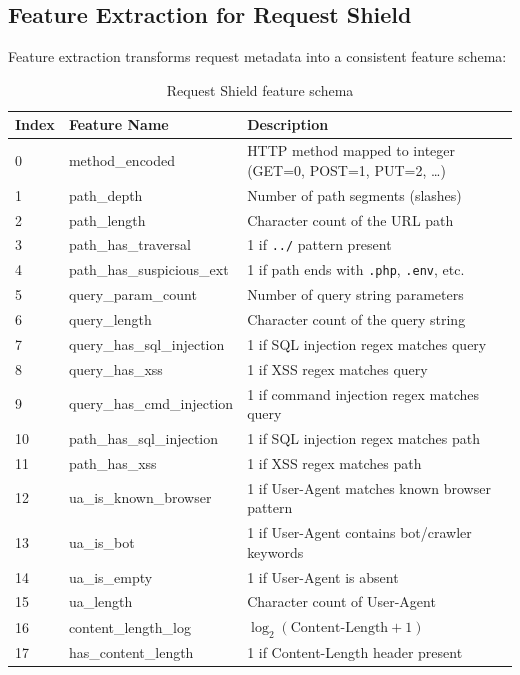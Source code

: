 \subsection{Feature Extraction for Request Shield}

Feature extraction transforms request metadata into a consistent feature schema:

\begin{table}[H]
\centering
\caption{Request Shield feature schema}\label{tab:features}
\small
\begin{tabularx}{\textwidth}{@{}l l X@{}}
\toprule
\textbf{Index} & \textbf{Feature Name} & \textbf{Description}\\
\midrule
0 & method\_encoded & HTTP method mapped to integer (GET=0, POST=1, PUT=2, \ldots)\\
1 & path\_depth & Number of path segments (slashes)\\
2 & path\_length & Character count of the URL path\\
3 & path\_has\_traversal & 1 if \texttt{../} pattern present\\
4 & path\_has\_suspicious\_ext & 1 if path ends with \texttt{.php}, \texttt{.env}, etc.\\
5 & query\_param\_count & Number of query string parameters\\
6 & query\_length & Character count of the query string\\
7 & query\_has\_sql\_injection & 1 if SQL injection regex matches query\\
8 & query\_has\_xss & 1 if XSS regex matches query\\
9 & query\_has\_cmd\_injection & 1 if command injection regex matches query\\
10 & path\_has\_sql\_injection & 1 if SQL injection regex matches path\\
11 & path\_has\_xss & 1 if XSS regex matches path\\
12 & ua\_is\_known\_browser & 1 if User-Agent matches known browser pattern\\
13 & ua\_is\_bot & 1 if User-Agent contains bot/crawler keywords\\
14 & ua\_is\_empty & 1 if User-Agent is absent\\
15 & ua\_length & Character count of User-Agent\\
16 & content\_length\_log & $\log_2(\text{Content-Length}+1)$\\
17 & has\_content\_length & 1 if Content-Length header present\\

\end{tabularx}
\end{table}
